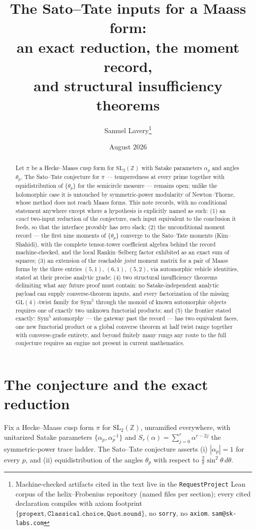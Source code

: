 \documentclass[11pt]{article}
\title{The Sato--Tate inputs for a Maass form:\\
an exact reduction, the moment record,\\
and structural insufficiency theorems}
\author{Samuel Lavery\thanks{Machine-checked artifacts cited in the text live in
the \texttt{RequestProject} Lean corpus of the helix--Frobenius repository
(named files per section); every cited declaration compiles with axiom footprint
$\{\texttt{propext},\texttt{Classical.choice},\texttt{Quot.sound}\}$, no
\texttt{sorry}, no \texttt{axiom}.  \texttt{sam@sk-labs.com}}}
\date{August 2026}
\theoremstyle{definition}
\theoremstyle{remark}
\newcommand{\Sym}{\mathrm{Sym}}
\newcommand{\GL}{\mathrm{GL}}
\newcommand{\Z}{\mathbb{Z}}
\begin{document}
\maketitle

\begin{abstract}
Let $\pi$ be a Hecke--Maass cusp form for $\mathrm{SL}_2(\Z)$ with Satake
parameters $\alpha_p$ and angles $\theta_p$.  The Sato--Tate conjecture for
$\pi$ --- temperedness at every prime together with equidistribution of
$\{\theta_p\}$ for the semicircle measure --- remains open; unlike the
holomorphic case it is untouched by symmetric-power modularity of
Newton--Thorne, whose method does not reach Maass forms.  This note records,
with no conditional statement anywhere except where a hypothesis is explicitly
named as such: (1) an \emph{exact} two-input reduction of the conjecture, each
input equivalent to the conclusion it feeds, so that the interface provably has
zero slack; (2) the unconditional moment record --- the first nine moments of
$\{\theta_p\}$ converge to the Sato--Tate moments (Kim--Shahidi), with the
complete tensor-tower coefficient algebra behind the record machine-checked,
and the local Rankin--Selberg factor exhibited as an exact sum of squares;
(3) an extension of the reachable \emph{joint} moment matrix for a pair of
Maass forms by the three entries $(5,1)$, $(6,1)$, $(5,2)$, via automorphic
vehicle identities, stated at their precise analytic grade; (4) two structural
insufficiency theorems delimiting what any future proof must contain: no
Satake-independent analytic payload can supply converse-theorem inputs, and
every factorization of the missing $\GL(4)$-twist family for $\Sym^5$ through
the monoid of known automorphic objects requires one of exactly two unknown
functorial products; and (5) the frontier stated exactly: $\Sym^5$ automorphy
--- the gateway past the record --- has two equivalent faces, one new
functorial product or a global converse theorem at half twist range together
with converse-grade entirety, and beyond finitely many rungs any route to the
full conjecture requires an engine not present in current mathematics.
\end{abstract}

\section{The conjecture and the exact reduction}\label{sec:reduction}

Fix a Hecke--Maass cusp form $\pi$ for $\mathrm{SL}_2(\Z)$, unramified
everywhere, with unitarized Satake parameters
$\{\alpha_p,\alpha_p^{-1}\}$ and $S_r(\alpha)=\sum_{j=0}^r\alpha^{r-2j}$ the
symmetric-power trace ladder.  The Sato--Tate conjecture asserts
(i) $|\alpha_p|=1$ for every $p$, and (ii) equidistribution of the angles
$\theta_p$ with respect to $\tfrac{2}{\pi}\sin^2\theta\,d\theta$.
\end{document}
